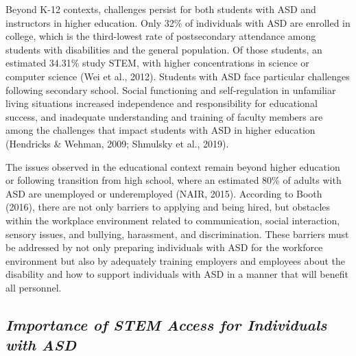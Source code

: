 \documentclass[11.5pt]{sig-alternate}
\begin{document}
\begin{large}
Beyond K-12 contexts, challenges persist for both students with ASD and instructors in higher education. Only 32\% of individuals with ASD are enrolled in college, which is the third-lowest rate of postsecondary attendance among students with disabilities and the general population. Of those students, an estimated 34.31\% study STEM, with higher concentrations in science or computer science (Wei et al., 2012). Students with ASD face particular challenges following secondary school. Social functioning and self-regulation in unfamiliar living situations increased independence and responsibility for educational success, and inadequate understanding and training of faculty members are among the challenges that impact students with ASD in higher education (Hendricks \& Wehman, 2009; Shmulsky et al., 2019). 

The issues observed in the educational context remain beyond higher education or following transition from high school, where an estimated 80\% of adults with ASD are unemployed or underemployed (NAIR, 2015). According to Booth (2016), there are not only barriers to applying and being hired, but obstacles within the workplace environment related to communication, social interaction, sensory issues, and bullying, harassment, and discrimination. These barriers must be addressed by not only preparing individuals with ASD for the workforce environment but also by adequately training employers and employees about the disability and how to support individuals with ASD in a manner that will benefit all personnel. 

\subsection*{\textbf{\textit{Importance of STEM Access for Individuals with ASD}}}


\end{large}
\end{document}
